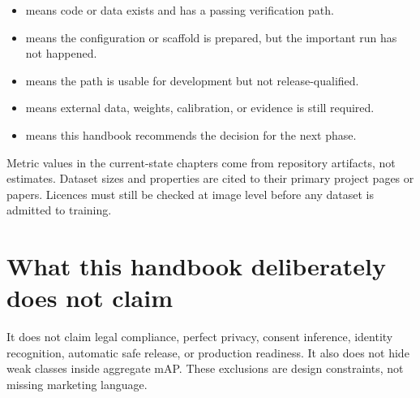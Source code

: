 \begin{itemize}[leftmargin=6mm]
  \item {} means code or data exists and has a passing verification path.
  \item {} means the configuration or scaffold is prepared, but the important run has not happened.
  \item {} means the path is usable for development but not release-qualified.
  \item {} means external data, weights, calibration, or evidence is still required.
  \item {} means this handbook recommends the decision for the next phase.
\end{itemize}

Metric values in the current-state chapters come from repository artifacts, not estimates. Dataset sizes and properties are cited to their primary project pages or papers. Licences must still be checked at image level before any dataset is admitted to training.

\section*{What this handbook deliberately does not claim}

It does not claim legal compliance, perfect privacy, consent inference, identity recognition, automatic safe release, or production readiness. It also does not hide weak classes inside aggregate mAP. These exclusions are design constraints, not missing marketing language.

\clearpage


